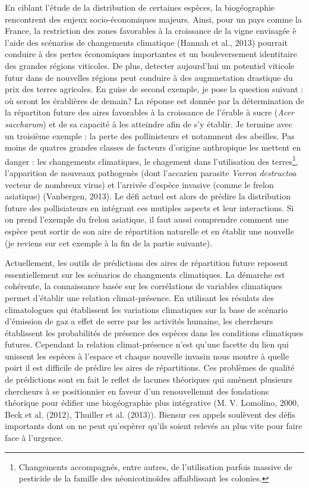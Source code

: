 En ciblant l'étude de la distribution de certaines espèces, la
biogéographie rencontrent des enjeux socio-économiques majeurs. Ainsi,
pour un pays comme la France, la restriction des zones favorables à la
croissance de la vigne envisagée è l'aide des scénarios de changements
climatique (Hannah et al., 2013) pourrait conduire à des pertes
économiques importantes et un bouleversement identitaire des grandes
régions viticoles. De plus, detecter aujourd'hui un potentiel viticole
futur dans de nouvelles régions peut conduire à des augmnetation
drastique du prix des terres agricoles. En guise de second exemple, je
pose la question suivant : où seront les érablières de demain? La
réponse est donnée par la détermination de la répartiton future des
aires favorables à la croissance de l'érable à sucre (\emph{Acer
saccharum}) et de sa capacité à les atteindre afin de s'y établir. Je
termine avec un troisième exemple : la perte des pollinisteurs et
notamment des abeilles. Pas moins de quatres grandes classes de facteurs
d'origine anthropique les mettent en danger : les changements
climatiques, le chagement dans l'utilisation des terres\footnote{Changements
  accompagnés, entre autres, de l'utilisation parfois massive de
  pesticide de la famille des néonicotinoïdes affaiblissant les
  colonies.}, l'apparition de nouveaux pathogenès (dont l'accarien
parasite \emph{Varroa destructoa} vecteur de nombreux virus) et
l'arrivée d'espèce invasive (comme le frelon asiatique) (Vanbergen,
2013). Le défi actuel est alors de prédire la distribution future des
pollisiateurs en intégrant ces mutiples aspects et leur interactions. Si
on prend l'exemple du frelon asiatique, il faut aussi comprendre comment
une espèce peut sortir de son aire de répartition naturelle et en
établir une nouvelle (je reviens sur cet exemple à la fin de la partie
suivante).

Actuellement, les outils de prédictions des aires de répartition future
reposent essentiellement sur les scénarios de changments climatiques. La
démarche est cohérente, la connaissance basée sur les corrélations de
variables climatiques permet d'établir une relation climat-présence. En
utilisant les résulats des climatologues qui établissent les variations
climatiques sur la base de scénario d'émission de gaz a effet de serre
par les activités humaine, les chercheurs établissent les probabilités
de présence des espèces dans les conditions climatiques futures.
Cependant la relation climat-présence n'est qu'une facette du lien qui
unissent les espèces à l'espace et chaque nouvelle invasin nous montre à
quelle poirt il est difficile de prédire les aires de répartitions. Ces
problèmes de qualité de prédictions sont en fait le reflet de lacunes
théoriques qui amènent plusieurs chercheurs à se positionnier en faveur
d'un renouvellemnt des fondations théorique pour édifier une
biogéographie plus intégrative (M. V. Lomolino, 2000, Beck et al.
(2012), Thuiller et al. (2013)). Biensur ces appels soulèvent des défis
importants dont on ne peut qu'espèrer qu'ils soient relevés au plus vite
pour faire face à l'urgence.

